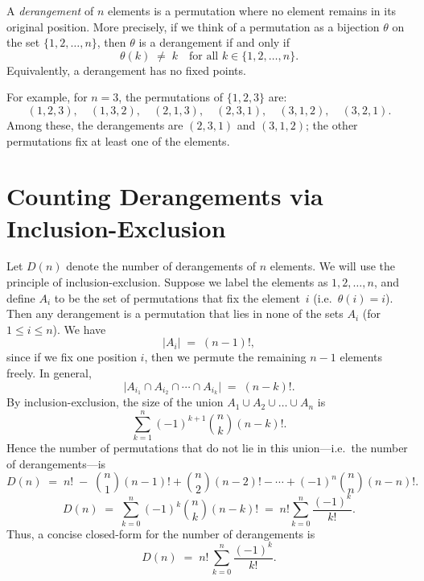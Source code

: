 \documentclass[docmute]{article}
\begin{document}
A \emph{derangement} of $n$ elements is a permutation where no element remains in its original position. More precisely, if we think of a permutation as a bijection $\theta$ on the set $\{1,2,\ldots,n\}$, then $\theta$ is a derangement if and only if 
\[
\theta(k) \;\neq\; k \quad \text{for all } k \in \{1,2,\dots,n\}.
\]
Equivalently, a derangement has no fixed points.

For example, for $n=3$, the permutations of $\{1,2,3\}$ are:
\[
(1,2,3), \quad (1,3,2), \quad (2,1,3), \quad (2,3,1), \quad (3,1,2), \quad (3,2,1).
\]
Among these, the derangements are $(2,3,1)$ and $(3,1,2)$; the other permutations fix at least one of the elements.

\section*{Counting Derangements via Inclusion-Exclusion}

Let $D(n)$ denote the number of derangements of $n$ elements. We will use the principle of inclusion-exclusion. Suppose we label the elements as $1,2,\dots,n$, and define $A_i$ to be the set of permutations that fix the element~$i$ (i.e.\ $\theta(i)=i$). Then any derangement is a permutation that lies in none of the sets $A_i$ (for $1 \le i \le n$). We have
\[
\bigl|A_i\bigr| \;=\; (n-1)!,
\]
since if we fix one position $i$, then we permute the remaining $n-1$ elements freely. In general,
\[
\bigl|A_{i_1} \cap A_{i_2} \cap \cdots \cap A_{i_k}\bigr| \;=\; (n-k)!.
\]
By inclusion-exclusion, the size of the union $A_1 \cup A_2 \cup \dots \cup A_n$ is
\[
\sum_{k=1}^{n} (-1)^{k+1} \binom{n}{k} (n-k)!.
\]
Hence the number of permutations that do not lie in this union---i.e.\ the number of derangements---is
\[
D(n) \;=\; n! \;-\; \binom{n}{1}(n-1)! + \binom{n}{2}(n-2)! - \cdots + (-1)^n \binom{n}{n}(n-n)!.
\]
\[
D(n) \;=\; \sum_{k=0}^{n} (-1)^k \binom{n}{k} (n-k)!
\;=\; n! \sum_{k=0}^{n} \frac{(-1)^k}{k!}.
\]
Thus, a concise closed-form for the number of derangements is
\[
D(n) \;=\; n!\,\sum_{k=0}^{n} \frac{(-1)^k}{k!}.
\]

\begin{center}
\end{center}
\end{document}
